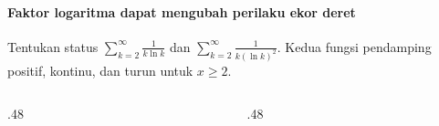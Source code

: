 \documentclass{../../kalkulus-ppt}
\begin{document}
\begin{frame}{\insertsection}
    \framesubtitle{Faktor logaritma dapat mengubah perilaku ekor deret}
    \begin{contoh}
        Tentukan status $\sum_{k=2}^\infty \frac1{k\ln k}$
        dan $\sum_{k=2}^\infty \frac1{k(\ln k)^2}$.
        Kedua fungsi pendamping positif, kontinu, dan turun untuk $x\ge2$.
    \end{contoh}
    \begin{columns}[T,onlytextwidth]
        \begin{column}{.48\textwidth}
        \end{column}
        \begin{column}{.48\textwidth}
        \end{column}
    \end{columns}
\end{frame}
\end{document}
